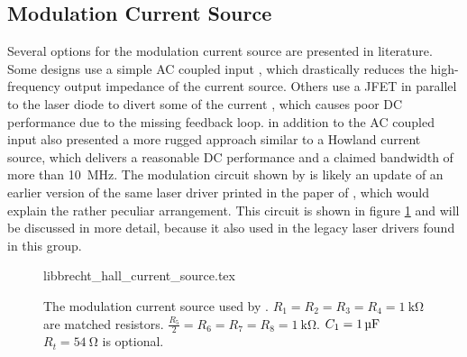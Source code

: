 \subsection{Modulation Current Source}%
\label{sec:modulation_current_source}
Several options for the modulation current source are presented in literature. Some designs use a simple AC coupled input \cite{diodelaser_modulation,libbrecht_hall}, which drastically reduces the high-frequency output impedance of the current source. Others use a JFET in parallel to the laser diode to divert some of the current \cite{laser_modulation_jfet,laser_modulation_jfet2,laser_modulation_jfet_appel}, which causes poor DC performance due to the missing feedback loop. \citeauthor{libbrecht_hall} \cite{laser_driver_digital,libbrecht_hall} in addition to the AC coupled input also presented a more rugged approach similar to a Howland current source, which delivers a reasonable DC performance and a claimed bandwidth of more than \qty{10}{\MHz}. The modulation circuit shown by \citeauthor{libbrecht_hall} is likely an update of an earlier version of the same laser driver printed in the paper of \citeauthor{diodelaser_modulation} \cite{diodelaser_modulation}, which would explain the rather peculiar arrangement. This circuit is shown in figure \ref{fig:libbrecht_hall_current_source} and will be discussed in more detail, because it also used in the legacy laser drivers found in this group.
\begin{figure}[ht]
    \centering
        {libbrecht_hall_current_source.tex}
    \caption{The modulation current source used by \cite{laser_driver_digital,libbrecht_hall}. $R_1 = R_2 = R_3 = R_4 = \qty{1}{\kilo\ohm}$ are matched resistors. $\frac{R_5}{2} = R_6 = R_7 = R_8 = \qty{1}{\kilo\ohm}$. $C_1 = \qty{1}{\uF}$ $R_{t} = \qty{54}{\ohm}$ is optional.}
    \label{fig:libbrecht_hall_current_source}
\end{figure}

